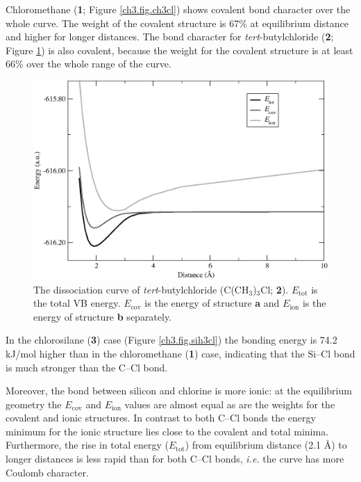 Chloromethane (\textbf{1}; Figure \ref{ch3.fig.ch3cl}) shows covalent bond character over the whole curve. The weight of the covalent structure is 67\% at equilibrium distance and higher for longer distances. The bond character for \textit{tert}-butylchloride (\textbf{2}; Figure \ref{ch3.fig.c4h9cl}) is also covalent, because the weight for the covalent structure is at least 66\% over the whole range of the curve.
\begin{figure}[htbp]
\begin{center}
\includegraphics[scale=0.50]{dissociation/figures/c4h9cl_g.eps}
\end{center}
\caption{The dissociation curve of \textit{tert}-butylchloride (C(CH$_3$)$_3$Cl; \textbf{2}). $E_\mathrm{tot}$ is the total VB energy. $E_\mathrm{cov}$ is the energy of structure \textbf{a} and $E_\mathrm{ion}$ is the energy of structure \textbf{b} separately. }
\label{ch3.fig.c4h9cl}
\end{figure}
In the chlorosilane (\textbf{3}) case (Figure \ref{ch3.fig.sih3cl}) the bonding energy is 74.2 kJ/mol higher than in the chloromethane (\textbf{1}) case, indicating that the Si--Cl bond is much stronger than the C--Cl bond.

Moreover, the bond between silicon and chlorine is more ionic: at the equilibrium geometry the $E_\mathrm{cov}$ and $E_\mathrm{ion}$ values are almost equal as are the weights for the covalent and ionic structures. In contrast to both C--Cl bonds the energy minimum for the ionic structure lies close to the covalent and total minima. Furthermore, the rise in total energy ($E_\mathrm{tot}$) from equilibrium distance (2.1 \AA) to longer distances is less rapid than for both C--Cl bonds, \textit{i.e.} the curve has more Coulomb character. 

